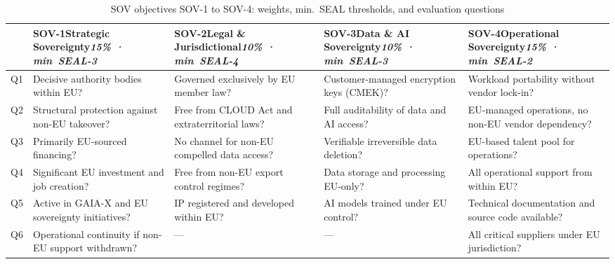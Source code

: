 \begin{table}[htbp]
\centering
\footnotesize
\renewcommand{\arraystretch}{1.25}
\caption{SOV objectives SOV-1 to SOV-4: weights, min.\ SEAL thresholds, and evaluation questions}
\label{tab:sov_objectives_a}
\begin{tabularx}{\linewidth}{|c|X|X|X|X|}
\hline
 &
\textbf{SOV-1}\newline Strategic Sovereignty\newline \textit{15\% · min~SEAL-3} &
\textbf{SOV-2}\newline Legal \& Jurisdictional\newline \textit{10\% · min~SEAL-4} &
\textbf{SOV-3}\newline Data \& AI Sovereignty\newline \textit{10\% · min~SEAL-3} &
\textbf{SOV-4}\newline Operational Sovereignty\newline \textit{15\% · min~SEAL-2} \\
\hline\hline
Q1 &
Decisive authority bodies within EU? &
Governed exclusively by EU member law? &
Customer-managed encryption keys (CMEK)? &
Workload portability without vendor lock-in? \\
\hline
Q2 &
Structural protection against non-EU takeover? &
Free from CLOUD Act and extraterritorial laws? &
Full auditability of data and AI access? &
EU-managed operations, no non-EU vendor dependency? \\
\hline
Q3 &
Primarily EU-sourced financing? &
No channel for non-EU compelled data access? &
Verifiable irreversible data deletion? &
EU-based talent pool for operations? \\
\hline
Q4 &
Significant EU investment and job creation? &
Free from non-EU export control regimes? &
Data storage and processing EU-only? &
All operational support from within EU? \\
\hline
Q5 &
Active in GAIA-X and EU sovereignty initiatives? &
IP registered and developed within EU? &
AI models trained under EU control? &
Technical documentation and source code available? \\
\hline
Q6 &
Operational continuity if non-EU support withdrawn? &
--- &
--- &
All critical suppliers under EU jurisdiction? \\
\hline
\end{tabularx}
\end{table}

